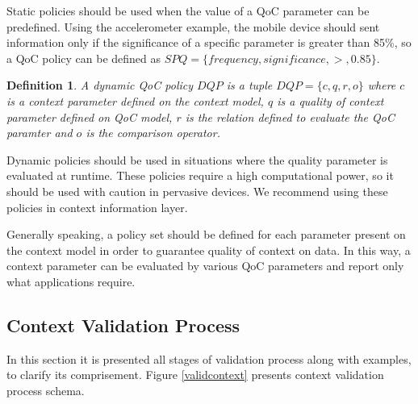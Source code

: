 \documentclass[letterpaper,conference]{IEEEtran}
\newtheorem{definition}{Definition}
\begin{document}
 Static policies should be used when the value of a QoC parameter can be predefined. 
 Using the accelerometer example, the mobile device should sent information only if the 
 significance \cite{manzoor2008evaluation} of a specific parameter is greater than 85\%, so a QoC policy can be defined as 
 $SPQ = \{frequency,significance,>,0.85\}$.
  
  \begin{definition}
   A dynamic QoC policy $DQP$ is a tuple $DQP = \{c,q,r,o\}$ where $c$ is a context 
   parameter defined on the context model, $q$ is a quality of context parameter 
   defined on QoC model, $r$ is the relation defined to evaluate the QoC paramter 
   and $o$ is the comparison operator.
  \end{definition}

  Dynamic policies should be used in situations where the quality parameter is evaluated
  at runtime. These policies require a high computational power, so it should be used 
  with caution in pervasive devices. We recommend using these policies in context 
  information layer.
  
  Generally speaking, a policy set should be defined for each parameter present on the 
  context model in order to guarantee quality of context on data. In this way, a 
  context parameter can be evaluated by various QoC parameters and report only what 
  applications require.
  

\subsection{Context Validation Process}
 
 In this section it is presented all stages of validation process along with examples, 
 to clarify its comprisement. Figure \ref{validcontext} presents context validation 
 process schema.
 
\end{document}
